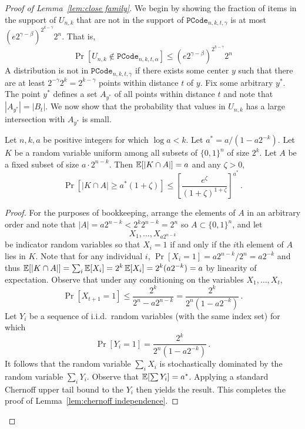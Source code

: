

 
\begin{proof}[Proof of Lemma~\ref{lem:close family}]
We begin by showing the fraction of items in the support of $U_{n,k}$ that are not in the support of $\mathtt{PCode}_{n, k, t, \gamma}$ is at most $\left(e2^{\gamma-\beta}\right)^{2^{k-\gamma}}2^n$.  That is, 
\[\Pr\left[U_{n,k} \not \in \mathtt{PCode}_{n, k, t, \alpha}\right] \le \left(e2^{\gamma-\beta}\right)^{2^{k-\gamma}}2^n
\]
A distribution is not in $\mathtt{PCode}_{n, k, t, \gamma}$ if there exists some center $y$ such that there are at least $2^{-\gamma}2^k = 2^{k-\gamma}$ points within distance $t$ of $y$.  Fix some arbitrary $y^*$. The point $y^*$ defines a set $A_{y^*}$ of all points within distance $t$ and note that $|A_{y^*}| = |B_t|$.  We now show that the probability that values in $U_{n,k}$ has a large intersection with $A_{y^*}$ is small.  

  \begin{lemma}
  \label{lem:chernoff independence}
  Let $n,k,a$ be positive integers for which $\log a < k$.  Let $a^* = a/(1 - a2^{-k})$. Let $K$
  be a random variable uniform among all subsets of $\{0,1\}^n$ of
  size $2^k$. Let $A$ be a fixed subset of size $a \cdot 2^{n-k}$. Then
  $\operatorname*{\mathbb{E}}[|K \cap A|] = a$ and any $\zeta > 0$,
  \[
    \Pr[|K \cap A| \geq a^*(1 + \zeta)] \leq \left[\frac{e^\zeta}{(1+\zeta)^{1+\zeta}}\right]^{a^*}\,.
  \]
\end{lemma}
\begin{proof}
  For the purposes of bookkeeping, arrange the elements of $A$ in an
  arbitrary order and note that $|A| = a2^{n-k} < 2^k2^{n-k} = 2^n$ so $A\subset \{0,1\}^n$, and let
  \[
    X_1, \ldots, X_{a2^{n-k}}
  \]
  be indicator random variables so that $X_i = 1$ if and only if the
  $i$th element of $A$ lies in $K$.  Note that for any individual $i$, $\Pr[X_i =1] =a2^{n-k}/2^n = a2^{-k}$ and thus $\operatorname*{\mathbb{E}}[|K\cap A|] =\sum_i \operatorname*{\mathbb{E}}[X_i] = 2^k \operatorname*{\mathbb{E}}[X_i] =2^k (a2^{-k})= a$ by linearity of expectation.  Observe that under any conditioning on the
  variables $X_1, \ldots, X_t$,
  \[
    \Pr[X_{t+1} = 1] \leq \frac{2^k}{2^n - a2^{n-k}} = \frac{2^k}{2^n(1 - a2^{-k})}\,.
  \]
   Let $Y_i$ be a sequence of
  i.i.d.\ random variables (with the same index set) for which
  \[
    \Pr[Y_i = 1] = \frac{2^{k}}{2^n(1 - a2^{-k})}\,.
  \]It follows that the random variable $\sum_i X_i$ is stochastically
  dominated by the random variable $\sum_i Y_i$. Observe that
  $\operatorname*{\mathbb{E}}[\sum Y_i] = a^*$. Applying a standard Chernoff upper tail
  bound to the $Y_i$ then yields the result. This completes the proof of Lemma~\ref{lem:chernoff independence}.
\end{proof}


\end{proof}
